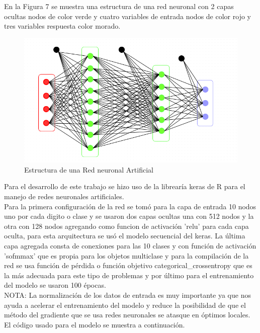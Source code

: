 \documentclass{article}
\begin{document}
En la Figura 7 se muestra una estructura de una red neuronal con 2 capas ocultas nodos de color verde y cuatro variables de entrada nodos de color rojo y tres variables respuesta color morado.  

\begin{figure}[H]
    \centering
	\includegraphics[scale=0.5]{figure/redes.png}
	\caption{Estructura de una Red neuronal Artificial}
\end{figure}

Para el desarrollo de este trabajo se hizo uso de la librearía keras de R para el manejo de redes neuronales artificiales.\\

Para la primera configuración de la red se tomó para la capa de entrada 10 nodos uno por cada digito o clase y se usaron dos capas ocultas una con 512 nodos y la otra con 128 nodos agregando como funcion de activación 'relu' para cada capa oculta, para esta arquitectura se usó el modelo secuencial del keras. 
La última capa agregada consta de conexiones para las 10 clases y con función de activación 'sofmmax' que es propia para los objetos multiclase y para la compilación de la red se usa función de pérdida o función objetivo categorical\_crossentropy que es la más adecuada para este tipo de problemas y por último para el entrenamiento del modelo se usaron 100 épocas.\\

NOTA: La normalización de los datos de entrada es muy importante ya que nos ayuda a acelerar el entrenamiento del modelo y reduce la posibilidad de que el método del gradiente que se usa redes neuronales se atasque en óptimos locales.\\
El código usado para el modelo se muestra a continuación.
\end{document}
